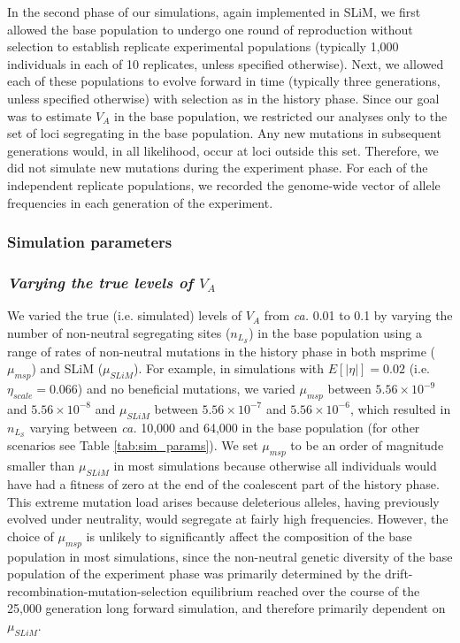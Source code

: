 \documentclass[12pt]{article}
\begin{document}
\begin{bibunit}
In the second phase of our simulations, again implemented in SLiM, we first allowed the base population to undergo one round of reproduction without selection to establish replicate experimental populations (typically 1,000 individuals in each of 10 replicates, unless specified otherwise). Next, we allowed each of these populations to evolve forward in time (typically three generations, unless specified otherwise) with selection as in the history phase. Since our goal was to estimate $V_A$ in the base population, we restricted our analyses only to the set of loci segregating in the base population. Any new mutations in subsequent generations would, in all likelihood, occur at loci outside this set.  Therefore, we did not simulate new mutations during the experiment phase. For each of the independent replicate populations, we recorded the genome-wide vector of allele frequencies in each generation of the experiment. 

\subsubsection*{Simulation parameters}

\subsubsection*{\textit{Varying the true levels of $V_A$}}

We varied the true (i.e. simulated) levels of $V_A$ from \textit{ca.} 0.01 to 0.1 by varying the number of non-neutral segregating sites ($n_{L_\mathcal{S}}$) in the base population using a range of rates of non-neutral mutations in the history phase in both msprime ($\mu_{msp}$) and SLiM ($\mu_{SLiM}$). For example, in simulations with $E[|\eta|] = 0.02$ (i.e. $\eta_{scale} = 0.066$) and no beneficial mutations, we varied $\mu_{msp}$ between $5.56 \times 10^{-9}$ and $5.56 \times 10^{-8}$ and $\mu_{SLiM}$ between $5.56 \times 10^{-7}$ and $5.56 \times 10^{-6}$, which resulted in  $n_{L_\mathcal{S}}$ varying between \emph{ca.} 10,000 and 64,000 in the base population (for other scenarios see Table \ref{tab:sim_params}). We set $\mu_{msp}$ to be an order of magnitude smaller than $\mu_{SLiM}$ in most simulations because otherwise all individuals would have had a fitness of zero at the end of the coalescent part of the history phase. This extreme mutation load arises because deleterious alleles, having previously evolved under neutrality, would segregate at fairly high frequencies. However, the choice of $\mu_{msp}$ is  unlikely to significantly affect the composition of the base population in most simulations, since the non-neutral genetic diversity of the base population of the experiment phase was primarily determined by the drift-recombination-mutation-selection equilibrium reached over the course of the 25,000 generation long forward simulation, and therefore primarily dependent on $\mu_{SLiM}$.


\end{bibunit}
\end{document}
